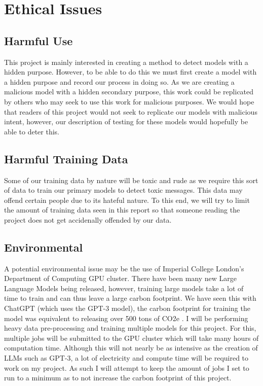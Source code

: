 \chapter{Ethical Issues}

\section{Harmful Use}

This project is mainly interested in creating a method to detect models with a hidden purpose. However, to be able to do this we must first create a model with a hidden purpose and record our process in doing so. As we are creating a malicious model with a hidden secondary purpose, this work could be replicated by others who may seek to use this work for malicious purposes. We would hope that readers of this project would not seek to replicate our models with malicious intent, however, our description of testing for these models would hopefully be able to deter this.

\section{Harmful Training Data}

Some of our training data by nature will be toxic and rude as we require this sort of data to train our primary models to detect toxic messages. This data may offend certain people due to its hateful nature. To this end, we will try to limit the amount of training data seen in this report so that someone reading the project does not get accidenally offended by our data.

\section{Environmental}

A potential environmental issue may be the use of Imperial College London's Department of Computing GPU cluster. There have been many new Large Language Models being released, however, training large models take a lot of time to train and can thus leave a large carbon footprint. We have seen this with ChatGPT (which uses the GPT-3 model), the carbon footprint for training the model was equivalent to releasing over 500 tons of CO2e \cite{chat_gpt_environment}. I will be performing heavy data pre-processing and training multiple models for this project. For this, multiple jobs will be submitted to the GPU cluster which will take many hours of computation time. Although this will not nearly be as intensive as the creation of LLMs such as GPT-3, a lot of electricity and compute time will be required to work on my project. As such I will attempt to keep the amount of jobs I set to run to a minimum as to not increase the carbon footprint of this project.

